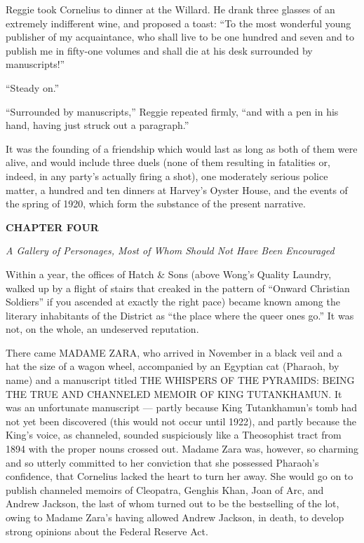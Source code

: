 \documentclass[12pt,openright]{book}
\begin{document}
Reggie took Cornelius to dinner at the Willard. He drank three glasses of an extremely indifferent wine, and proposed a toast: “To the most wonderful young publisher of my acquaintance, who shall live to be one hundred and seven and to publish me in fifty-one volumes and shall die at his desk surrounded by manuscripts!”

“Steady on.”

“Surrounded by manuscripts,” Reggie repeated firmly, “and with a pen in his hand, having just struck out a paragraph.”

It was the founding of a friendship which would last as long as both of them were alive, and would include three duels (none of them resulting in fatalities or, indeed, in any party’s actually firing a shot), one moderately serious police matter, a hundred and ten dinners at Harvey’s Oyster House, and the events of the spring of 1920, which form the substance of the present narrative.

\textbf{CHAPTER FOUR}

\textit{A Gallery of Personages, Most of Whom Should Not Have Been Encouraged}

Within a year, the offices of Hatch \& Sons (above Wong’s Quality Laundry, walked up by a flight of stairs that creaked in the pattern of “Onward Christian Soldiers” if you ascended at exactly the right pace) became known among the literary inhabitants of the District as “the place where the queer ones go.” It was not, on the whole, an undeserved reputation.

There came MADAME ZARA, who arrived in November in a black veil and a hat the size of a wagon wheel, accompanied by an Egyptian cat (Pharaoh, by name) and a manuscript titled THE WHISPERS OF THE PYRAMIDS: BEING THE TRUE AND CHANNELED MEMOIR OF KING TUTANKHAMUN. It was an unfortunate manuscript — partly because King Tutankhamun’s tomb had not yet been discovered (this would not occur until 1922), and partly because the King’s voice, as channeled, sounded suspiciously like a Theosophist tract from 1894 with the proper nouns crossed out. Madame Zara was, however, so charming and so utterly committed to her conviction that she possessed Pharaoh’s confidence, that Cornelius lacked the heart to turn her away. She would go on to publish channeled memoirs of Cleopatra, Genghis Khan, Joan of Arc, and Andrew Jackson, the last of whom turned out to be the bestselling of the lot, owing to Madame Zara’s having allowed Andrew Jackson, in death, to develop strong opinions about the Federal Reserve Act.
\end{document}
